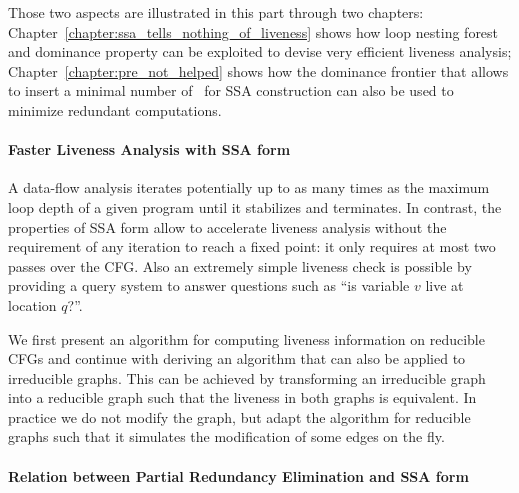Those two aspects are illustrated in this part through two chapters:
Chapter~\ref{chapter:ssa_tells_nothing_of_liveness} shows how loop
nesting forest and dominance property can be exploited to devise very
efficient liveness analysis; Chapter~\ref{chapter:pre_not_helped}
shows how the dominance frontier that allows to insert a minimal number of
\phifun\ for SSA construction can also be used to minimize redundant
computations.

\paragraph{Faster Liveness Analysis with SSA form}
A data-flow analysis iterates potentially up to as many times as the
maximum loop depth of a given program until it stabilizes and
terminates. In contrast, the properties of SSA form allow to
accelerate liveness analysis without the requirement of any iteration
to reach a fixed point: it only requires at most two passes over the
CFG. Also an extremely simple liveness check is possible by providing
a query system to answer questions such as ``is variable $v$ live at
location $q$?''.

We first present an algorithm for computing liveness information on
reducible CFGs and continue with deriving an algorithm that can also
be applied to irreducible graphs. This can be achieved by transforming
an irreducible graph into a reducible graph such that the liveness in
both graphs is equivalent. In practice we do not modify the graph, but
adapt the algorithm for reducible graphs such that it simulates the
modification of some edges on the fly.

\paragraph{Relation between Partial Redundancy Elimination and SSA form}

